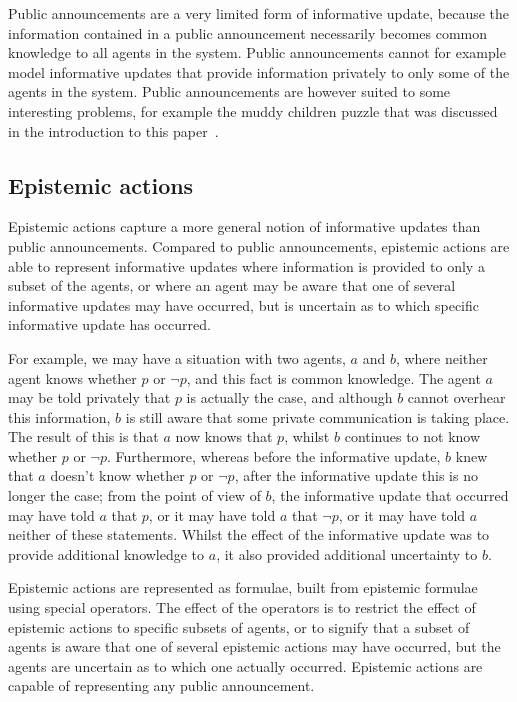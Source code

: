 Public announcements are a very limited form of informative update, because the
information contained in a public announcement necessarily becomes common
knowledge to all agents in the system. Public announcements cannot for example
model informative updates that provide information privately to only some of
the agents in the system. Public announcements are however suited to some
interesting problems, for example the muddy children puzzle that was discussed
in the introduction to this paper~\cite{vanditmarsch2007dynamic}.

\subsection*{Epistemic actions}

Epistemic actions capture a more general notion of informative updates than
public announcements. Compared to public announcements, epistemic actions are
able to represent informative updates where information is provided to only a
subset of the agents, or where an agent may be aware that one of several
informative updates may have occurred, but is uncertain as to which specific
informative update has occurred. 

For example, we may have a situation with two agents, $a$ and $b$, where neither
agent knows whether $p$ or $\neg p$, and this fact is common knowledge. The
agent $a$ may be told privately that $p$ is actually the case, and although $b$
cannot overhear this information, $b$ is still aware that some private
communication is taking place. The result of this is that $a$ now knows that
$p$, whilst $b$ continues to not know whether $p$ or $\neg p$. Furthermore,
whereas before the informative update, $b$ knew that $a$ doesn't know whether
$p$ or $\neg p$, after the informative update this is no longer the case; from
the point of view of $b$, the informative update that occurred may have told $a$
that $p$, or it may have told $a$ that $\neg p$, or it may have told $a$
neither of these statements. Whilst the effect of the informative update was to
provide additional knowledge to $a$, it also provided additional uncertainty to
$b$.

Epistemic actions are represented as formulae, built from epistemic formulae
using special operators. The effect of the operators is to restrict the effect
of epistemic actions to specific subsets of agents, or to signify that a subset
of agents is aware that one of several epistemic actions may have occurred, but
the agents are uncertain as to which one actually occurred. Epistemic actions
are capable of representing any public announcement.

